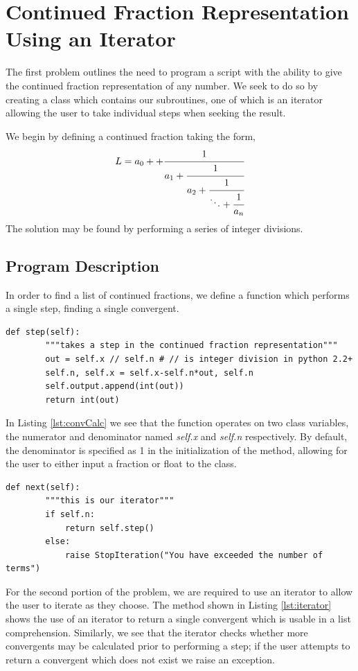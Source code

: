 \section{Continued Fraction Representation Using an Iterator} %
\label{sec:continued_fraction_representation_using_an_iterator}
The first problem outlines the need to program a script with the ability to give the continued fraction representation of any number. We seek to do so by creating a class which contains our subroutines, one of which is an iterator allowing the user to take individual steps when seeking the result.

We begin by defining a continued fraction taking the form,
\begin{equation}
    L = a_0 + + \cfrac{1}{a_1
              + \cfrac{1}{a_2
              + \cfrac{1}{\ddots
              + \cfrac{1}{a_n}}}}
\end{equation}
The solution may be found by performing a series of integer divisions.
\subsection{Program Description} %
\label{sub:program_description}
In order to find a list of continued fractions, we define a function which performs a single step, finding a single convergent.
\begin{lstlisting}[caption={Calculation of a single convergent}, label=lst:convCalc,firstnumber=8]
    def step(self):
        """takes a step in the continued fraction representation"""
        out = self.x // self.n # // is integer division in python 2.2+
        self.n, self.x = self.x-self.n*out, self.n
        self.output.append(int(out))
        return int(out)
\end{lstlisting}\noindent
In Listing \ref{lst:convCalc} we see that the function operates on two class variables, the numerator and denominator named \emph{self.x} and \emph{self.n} respectively. By default, the denominator is specified as 1 in the initialization of the method, allowing for the user to either input a fraction or float to the class. 
\begin{lstlisting}[caption={Class iterator}, label=lst:iterator,firstnumber=15]
    def next(self):
        """this is our iterator"""
        if self.n:
            return self.step()
        else:
            raise StopIteration("You have exceeded the number of terms")
\end{lstlisting}\noindent
For the second portion of the problem, we are required to use an iterator to allow the user to iterate as they choose. The method shown in Listing \ref{lst:iterator} shows the use of an iterator to return a single convergent which is usable in a list comprehension. Similarly, we see that the iterator checks whether more convergents may be calculated prior to performing a step; if the user attempts to return a convergent which does not exist we raise an exception.

